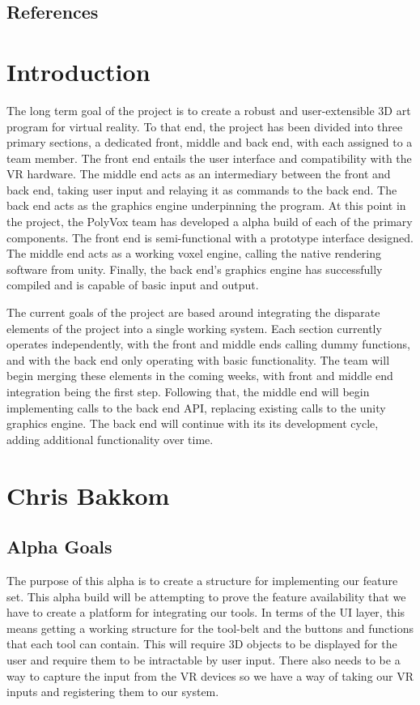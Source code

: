 \documentclass[onecolumn, draftclsnofoot,10pt, compsoc]{IEEEtran}
\begin{document}

\subsection{References}

{}

\section{Introduction}
The long term goal of the project is to create a robust and user-extensible 3D art program for virtual reality. To that end, the project has been divided into three primary sections, a dedicated front, middle and back end, with each assigned to a team member. The front end entails the user interface and compatibility with the VR hardware. The middle end acts as an intermediary between the front and back end, taking user input and relaying it as commands to the back end. The back end acts as the graphics engine underpinning the program. At this point in the project, the PolyVox team has developed a alpha build of each of the primary components. The front end is semi-functional with a prototype interface designed. The middle end acts as a working voxel engine, calling the native rendering software from unity. Finally, the back end’s graphics engine has successfully compiled and is capable of basic input and output.

The current goals of the project are based around integrating the disparate elements of the project into a single working system. Each section currently operates independently, with the front and middle ends calling dummy functions, and with the back end only operating with basic functionality. The team will begin merging these elements in the coming weeks, with front and middle end integration being the first step. Following that, the middle end will begin implementing calls to the back end API, replacing existing calls to the unity graphics engine. The back end will continue with its its development cycle, adding additional functionality over time.

\section{Chris Bakkom}
\subsection{Alpha Goals}
The purpose of this alpha is to create a structure for implementing our feature set. This alpha build will be attempting to prove the feature availability that we have to create a platform for integrating our tools. In terms of the UI layer, this means getting a working structure for the tool-belt and the buttons and functions that each tool can contain. This will require 3D objects to be displayed for the user and require them to be intractable by user input. There also needs to be a way to capture the input from the VR devices so we have a way of taking our VR inputs and registering them to our system.
\end{document}
